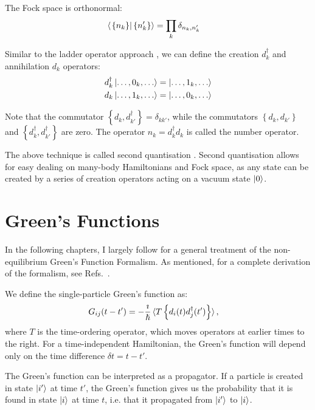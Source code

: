The Fock space is orthonormal:
\begin{align*}
\braket{ \left. \left\{ n_k \right\} \right| \left\{ n_k' \right\}} &= \prod_{k} \delta_{n_k, n_k'}
\end{align*}

Similar to the ladder operator approach \cite{griffiths}, we can define the creation $d^\dagger_k$ and annihilation $d_k$ operators:
\begin{align*}
d_k^\dagger \ket{\ldots, 0_k, \ldots} &=\ket{\ldots, 1_k, \ldots}\\
d_k \ket{\ldots, 1_k, \ldots} &=\ket{\ldots, 0_k, \ldots}
\end{align*}

Note that the commutator $\left\{ d_k, d_{k'}^\dagger\right\} = \delta_{kk'}$, while the commutators $\left\{ d_k, d_{k'}\right\}$ and $\left\{ d_k^\dagger, d_{k'}^\dagger\right\}$ are zero. The operator $n_k = d_k^\dagger d_k$ is called the number operator. 

The above technique is called second quantisation \cite{yuli}. Second quantisation allows for easy dealing on many-body Hamiltonians and Fock space, as any state can be created by a series of creation operators acting on a vacuum state $\ket{0}$. 
 

\section{Green's Functions}
\label{sec:greensfunctions}
In the following chapters, I largely follow \citet{seldenthuis} for a general treatment of the non-equilibrium Green's Function Formalism. As mentioned, for a complete derivation of the formalism, see Refs.~\cite{mattuck,diventra,haugjauho}.

We define the single-particle Green's function as:
\begin{align}
G_{ij} (t-t') &= -\frac{\imath}{\hslash} \braket{ T\left\{d_i(t)d_j^\dagger(t')\right\}},
\label{eq:greensfunction}
\end{align}
where $T$ is the time-ordering operator, which moves operators at earlier times to the right. For a time-independent Hamiltonian, the Green's function will depend only on the time difference $\delta t = t - t'$. 

The Green's function can be interpreted as a propagator. If a particle is created in state $\ket{i'}$ at time $t'$, the Green's function gives us the probability that it is found in state $\ket{i}$ at time $t$, i.e. that it propagated from $\ket{i'}$ to $\ket{i}$.

